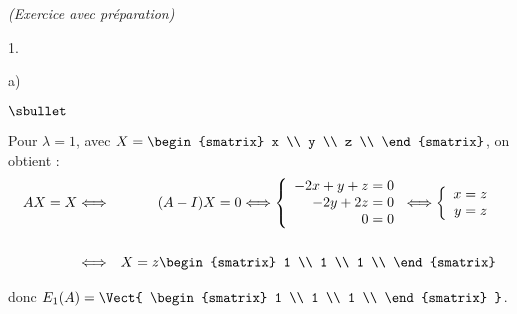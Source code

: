 \documentclass[11pt]{article}%
\begin{document}
\begin{exercice}{\it (Exercice avec préparation)}
\begin{noliste}{1.}
\begin{noliste}{a)}
\begin{noliste}{$\sbullet$}
 \item Pour $\lambda = 1$, avec $X = \begin{smatrix}
x \\
y \\
z \\
\end{smatrix}
$, on obtient : 
 \begin{eqnarray*}
 A X = X & \Longleftrightarrow & ( A - I ) X = 0 \Longleftrightarrow
\left\{\begin{array}{r}
 -2x + y + z = 0 \\
-2 y + 2 z = 0 \\
0 = 0 \\
\end{array}
\right. \Longleftrightarrow \left\{\begin{array}{r}
 x = z \\
y = z \\
\end{array}
\right. \\
\\
 & \Longleftrightarrow & X = z \begin{smatrix}
1 \\
1 \\
1 \\
\end{smatrix}
 \end{eqnarray*}

 donc $E_{1} ( A ) = \Vect { \begin{smatrix}
1 \\
1 \\
1 \\
\end{smatrix}
}$.


\end{noliste}
\end{noliste}
\end{noliste}
\end{exercice}
\end{document}
